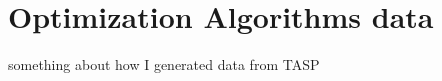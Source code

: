 \section{Optimization Algorithms data}\label{sec:optimization-algorithms-data}
something about how I generated data from TASP 